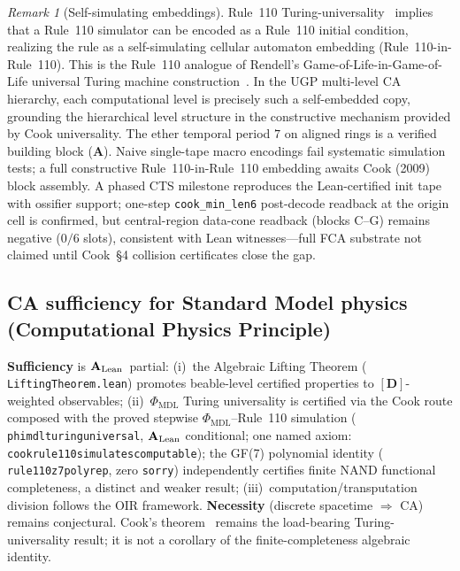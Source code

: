 \documentclass[11pt]{article}
\theoremstyle{remark}
\newtheorem{remark}[theorem]{Remark}
\newcommand{\lean}[1]{%
  \penalty-100
  \begingroup\def\_{\textunderscore\allowbreak}\texttt{#1}\endgroup}
\newcommand{\CatA}{\textbf{A}}
\newcommand{\CatAL}{\ensuremath{\textbf{A}_{\rm Lean}}}
\begin{document}
\begin{remark}[Self-simulating embeddings]
\label{rem:self_embedding}
Rule~110 Turing-universality~\cite{Cook2004,Cook2009} implies that a Rule~110 simulator
can be encoded as a Rule~110 initial condition, realizing the rule as a
self-simulating cellular automaton embedding (Rule~110-in-Rule~110). This is the
Rule~110 analogue of Rendell's Game-of-Life-in-Game-of-Life universal Turing machine
construction~\cite{Rendell2011}. In the UGP multi-level CA hierarchy, each
computational level is precisely such a self-embedded copy, grounding the
hierarchical level structure in the constructive mechanism provided by Cook universality.
The ether temporal period $7$ on aligned rings is a verified building block (\CatA).
Naive single-tape macro encodings fail systematic simulation tests; a full constructive
Rule~110-in-Rule~110 embedding awaits Cook (2009) block assembly.
A phased CTS milestone reproduces the Lean-certified init tape with ossifier support;
one-step \texttt{cook\_min\_len6} post-decode readback at the origin cell is confirmed,
but central-region data-cone readback (blocks C--G) remains negative
($0/6$ slots), consistent with Lean witnesses---full FCA substrate not claimed until
Cook~\S4 collision certificates close the gap.
\end{remark}

\subsection{CA sufficiency for Standard Model physics (Computational Physics Principle)}
\label{ssec:cpp_sufficiency}

\textbf{Sufficiency} is \CatAL\ partial: (i)~the Algebraic Lifting Theorem
(\lean{Lifting\allowbreak{}Theorem\allowbreak.lean}) promotes beable-level certified properties to
$[\mathbf{D}]$-weighted observables; (ii)~$\Phi_{\mathrm{MDL}}$ Turing universality
is certified via the Cook route composed with the proved stepwise
$\Phi_{\mathrm{MDL}}$--Rule~110 simulation (\lean{phimdl\_turing\_universal},
$\CatAL$ conditional; one named axiom:
\lean{cook\_rule110\_simulates\_computable}); the GF(7) polynomial identity
(\lean{rule110\_z7\_poly\_rep}, zero \texttt{sorry}) independently certifies finite
NAND functional completeness, a distinct and weaker result; (iii)~computation/transputation
division follows the OIR framework.
\textbf{Necessity} (discrete spacetime $\Rightarrow$ CA) remains conjectural.
Cook's theorem~\cite{Cook2004} remains the load-bearing Turing-universality result;
it is not a corollary of the finite-completeness algebraic identity.
\end{document}
